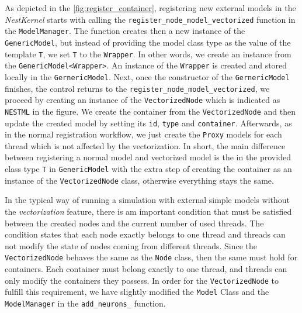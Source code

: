 As depicted in the \autoref{fig:register_container}, registering new external models in the \emph{NestKernel} starts with calling the \texttt{register\_node\_model\_vectorized} function in the \texttt{ModelManager}. The function creates then a new instance of the \texttt{GenericModel}, but instead of providing the model class type as the value of the template \texttt{T}, we set \texttt{T} to the \texttt{Wrapper}. In other words, we create an instance from the \texttt{GenericModel<Wrapper>}. An instance of the \texttt{Wrapper} is created and stored locally in the \texttt{GernericModel}. Next, once the constructor of the \texttt{GernericModel} finishes, the control returns to the \texttt{register\_node\_model\_vectorized}, we proceed by creating an instance of the \texttt{VectorizedNode} which is indicated as \texttt{NESTML} in the figure. We create the container from the \texttt{VectorizedNode} and then update the created model by setting its \texttt{id}, \texttt{type} and \texttt{container}. Afterwards, as in the normal registration workflow, we just create the \texttt{Proxy} models for each thread which is not affected by the vectorization. In short, the main difference between registering a normal model and vectorized model is the in the provided class type \texttt{T} in \texttt{GenericModel} with the extra step of creating the container as an instance of the \texttt{VectorizedNode} class, otherwise everything stays the same.


In the typical way of running a simulation with external simple models without the \emph{vectorization} feature, there is am important condition that must be satisfied between the created nodes and the current number of used threads. The condition states that each node exactly belongs to one thread and threads can not modify the state of nodes coming from different threads. Since the \texttt{VectorizedNode} behaves the same as the \texttt{Node} class, then the same must hold for containers. Each container must belong exactly to one thread, and threads can only modify the containers they possess. In order for the \texttt{VectorizedNode} to fulfill this requirement, we have slightly modified the \texttt{Model} Class and the \texttt{ModelManager} in the \texttt{add\_neurons\_} function.\\


